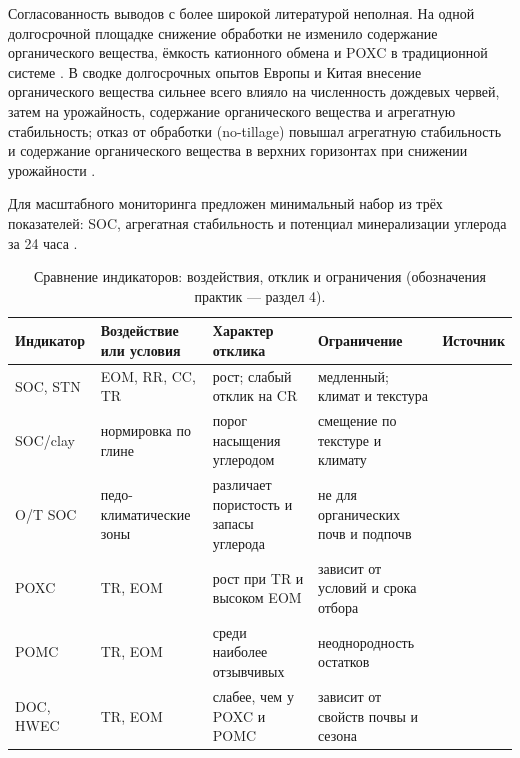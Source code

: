 \documentclass{ai4science_ysda}
\begin{document}
Согласованность выводов с более широкой литературой неполная. На одной
долгосрочной площадке снижение обработки не изменило содержание
органического вещества, ёмкость катионного обмена и POXC в традиционной
системе \cite{pearsons2023}. В сводке долгосрочных опытов Европы и Китая
внесение органического вещества сильнее всего влияло на численность
дождевых червей, затем на урожайность, содержание органического вещества и
агрегатную стабильность; отказ от обработки (no-tillage) повышал
агрегатную стабильность и содержание органического вещества в верхних
горизонтах при снижении урожайности \cite{bai2018}.

Для масштабного мониторинга предложен минимальный набор из трёх
показателей: SOC, агрегатная стабильность и потенциал минерализации
углерода за 24 часа \cite{bagnall2023}.

\begin{table}[!htbp]
  \centering
  \caption{Сравнение индикаторов: воздействия, отклик и ограничения
  (обозначения практик --- раздел 4).}
  \label{tab:indicators}
  \small
  \setlength{\tabcolsep}{2pt}
  \renewcommand{\arraystretch}{0.9}
  \begin{tabular}{@{}>{\raggedright\arraybackslash}p{}
      >{\raggedright\arraybackslash}p{}
      >{\raggedright\arraybackslash}p{}
      >{\raggedright\arraybackslash}p{}
      >{\raggedright\arraybackslash}p{}@{}}
    \hline
    \textbf{Индикатор} & \textbf{Воздействие или условия} &
    \textbf{Характер отклика} & \textbf{Ограничение} &
    \textbf{Источник} \\
    \hline
    SOC, STN & EOM, RR, CC, TR & рост; слабый отклик на CR & медленный;
    климат и текстура & \cite{cusset2024} \\
    SOC/clay & нормировка по глине & порог насыщения углеродом & смещение по
    текстуре и климату & \cite{feeney2024} \\
    O/T SOC & педо-климатические зоны & различает пористость и запасы
    углерода & не для органических почв и подпочв & \cite{feeney2024} \\
    POXC & TR, EOM & рост при TR и высоком EOM & зависит от условий и срока
    отбора & \cite{bongiorno2019} \\
    POMC & TR, EOM & среди наиболее отзывчивых & неоднородность остатков &
    \cite{bongiorno2019} \\
    DOC, HWEC & TR, EOM & слабее, чем у POXC и POMC & зависит от свойств
    почвы и сезона & \cite{bongiorno2019} \\

\end{tabular}
\end{table}
\end{document}
